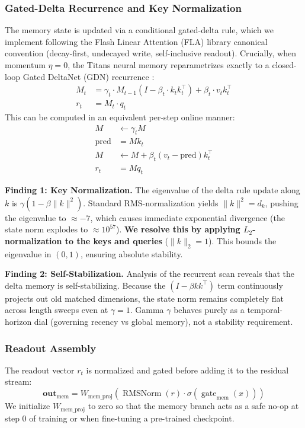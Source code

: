 \documentclass{article} %
\begin{document}
\subsubsection{Gated-Delta Recurrence and Key Normalization}
The memory state is updated via a conditional gated-delta rule, which we implement following the Flash Linear Attention (FLA) library \citep{fla2024} canonical convention (decay-first, undecayed write, self-inclusive readout). Crucially, when momentum $\eta = 0$, the Titans neural memory reparametrizes exactly to a closed-loop Gated DeltaNet (GDN) recurrence \citep{yang2024gated}:
\begin{align}
    M_t &= \gamma_t \cdot M_{t-1} (I - \beta_t \cdot k_t k_t^{\top}) + \beta_t \cdot v_t k_t^{\top} \\
    r_t &= M_t \cdot q_t
\end{align}
This can be computed in an equivalent per-step online manner:
\begin{align}
    M &\leftarrow \gamma_t M \\
    \mathrm{pred} &= M k_t \\
    M &\leftarrow M + \beta_t (v_t - \mathrm{pred}) k_t^{\top} \\
    r_t &= M q_t
\end{align}

\textbf{Finding 1: Key Normalization.} The eigenvalue of the delta rule update along $k$ is $\gamma (1 - \beta \|k\|^2)$. Standard RMS-normalization yields $\|k\|^2 = d_k$, pushing the eigenvalue to $\approx -7$, which causes immediate exponential divergence (the state norm explodes to $\approx 10^{57}$). \textbf{We resolve this by applying $L_2$-normalization to the keys and queries} ($\|k\|_2 = 1$). This bounds the eigenvalue in $(0, 1)$, ensuring absolute stability.

\textbf{Finding 2: Self-Stabilization.} Analysis of the recurrent scan reveals that the delta memory is self-stabilizing. Because the $(I - \beta k k^{\top})$ term continuously projects out old matched dimensions, the state norm remains completely flat across length sweeps even at $\gamma=1$. Gamma $\gamma$ behaves purely as a temporal-horizon dial (governing recency vs global memory), not a stability requirement.

\subsubsection{Readout Assembly}
The readout vector $r_t$ is normalized and gated before adding it to the residual stream:
\begin{equation}
    \mathbf{out}_{\text{mem}} = W_{\text{mem\_proj}}\left( \operatorname{RMSNorm}(r) \cdot \sigma(\operatorname{gate}_{\text{mem}}(x)) \right)
\end{equation}
We initialize $W_{\text{mem\_proj}}$ to zero so that the memory branch acts as a safe no-op at step 0 of training or when fine-tuning a pre-trained checkpoint.
\end{document}
